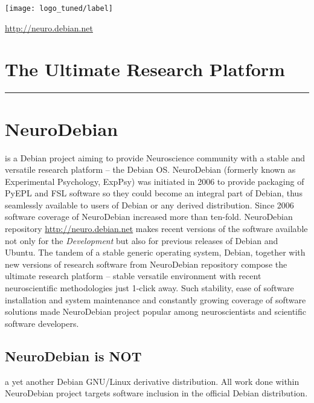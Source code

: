 \documentclass[letterpaper,landscape]{report}
\begin{document}
\pagebreak
\begin{multicols}{3}    %

\begin{center}
\noindent
\vspace{-3em}
\texttt{[image: logo\_tuned/label]}

\url{http://neuro.debian.net}
\section*{The Ultimate Research Platform}
\hrule

\end{center}

\section*{NeuroDebian}

is a Debian project aiming to provide Neuroscience community with a
stable and versatile research platform -- the Debian OS.  NeuroDebian
(formerly known as Experimental Psychology, ExpPsy) was initiated in
2006 to provide packaging of PyEPL and FSL software so they could
become an integral part of Debian, thus seamlessly available to users
of Debian or any derived distribution.  Since 2006 software coverage
of NeuroDebian increased more than ten-fold.  NeuroDebian repository
\url{http://neuro.debian.net} makes recent versions of the software
available not only for the \emph{Development} but also for previous
releases of Debian and Ubuntu.  The tandem of a stable generic
operating system, Debian, together with new versions of research
software from NeuroDebian repository compose the ultimate research
platform -- stable versatile environment with recent neuroscientific
methodologies just 1-click away.  Such stability, ease of software
installation and system maintenance and constantly growing coverage of
software solutions made NeuroDebian project popular among
neuroscientists and scientific software developers.


\subsection*{NeuroDebian is NOT}

a yet another Debian GNU/Linux derivative distribution.  All work done
within NeuroDebian project targets software inclusion in the official
Debian distribution.



\end{multicols}
\end{document}
